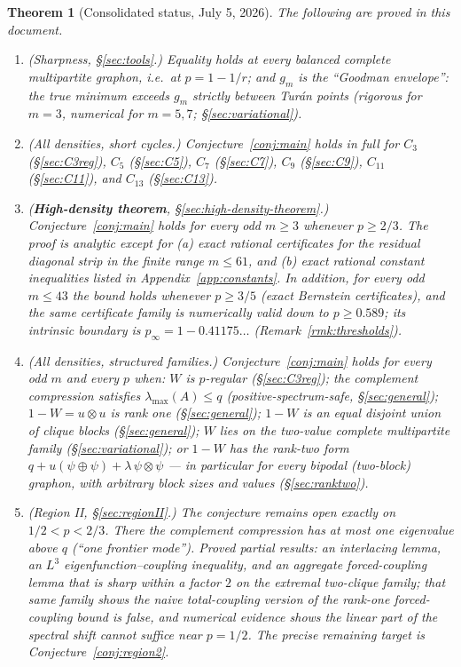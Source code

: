 \documentclass[11pt]{article}
\newtheorem{theorem}{Theorem}[section]
\begin{document}
\begin{theorem}[Consolidated status, July 5, 2026]\label{thm:status}
The following are proved in this document.
\begin{enumerate}[label=\textup{(\roman*)}]
\item \textup{(Sharpness, \S\ref{sec:tools}.)}  Equality holds at every balanced complete multipartite graphon, i.e.\ at $p=1-1/r$; and $g_m$ is the ``Goodman envelope'': the true minimum exceeds $g_m$ strictly between Tur\'an points (rigorous for $m=3$, numerical for $m=5,7$; \S\ref{sec:variational}).
\item \textup{(All densities, short cycles.)}  Conjecture~\ref{conj:main} holds in full for $C_3$ (\S\ref{sec:C3reg}), $C_5$ (\S\ref{sec:C5}), $C_7$ (\S\ref{sec:C7}), $C_9$ (\S\ref{sec:C9}), $C_{11}$ (\S\ref{sec:C11}), and $C_{13}$ (\S\ref{sec:C13}).
\item \textup{(\textbf{High-density theorem}, \S\ref{sec:high-density-theorem}.)}  Conjecture~\ref{conj:main} holds for \emph{every} odd $m\ge3$ whenever $p\ge2/3$.  The proof is analytic except for (a) exact rational certificates for the residual diagonal strip in the finite range $m\le61$, and (b) exact rational constant inequalities listed in Appendix~\ref{app:constants}.  In addition, for every odd $m\le43$ the bound holds whenever $p\ge3/5$ (exact Bernstein certificates), and the same certificate family is numerically valid down to $p\ge0.589$; its intrinsic boundary is $p_\infty=1-0.41175\ldots$ (Remark~\ref{rmk:thresholds}).
\item \textup{(All densities, structured families.)}  Conjecture~\ref{conj:main} holds for every odd $m$ and every $p$ when: $W$ is $p$-regular (\S\ref{sec:C3reg}); the complement compression satisfies $\lambda_{\max}(A)\le q$ (positive-spectrum-safe, \S\ref{sec:general}); $1-W=u\otimes u$ is rank one (\S\ref{sec:general}); $1-W$ is an equal disjoint union of clique blocks (\S\ref{sec:general}); $W$ lies on the two-value complete multipartite family (\S\ref{sec:variational}); or $1-W$ has the rank-two form $q+u(\psi\oplus\psi)+\lambda\,\psi\otimes\psi$ --- in particular for \emph{every} bipodal (two-block) graphon, with arbitrary block sizes and values (\S\ref{sec:ranktwo}).
\item \textup{(Region II, \S\ref{sec:regionII}.)}  The conjecture remains open exactly on $1/2<p<2/3$.  There the complement compression has at most one eigenvalue above $q$ (``one frontier mode'').  Proved partial results: an interlacing lemma, an $L^3$ eigenfunction--coupling inequality, and an aggregate forced-coupling lemma that is sharp within a factor $2$ on the extremal two-clique family; that same family shows the naive total-coupling version of the rank-one forced-coupling bound is false, and numerical evidence shows the linear part of the spectral shift cannot suffice near $p=1/2$.  The precise remaining target is Conjecture~\ref{conj:region2}.
\end{enumerate}
\end{theorem}
\end{document}
